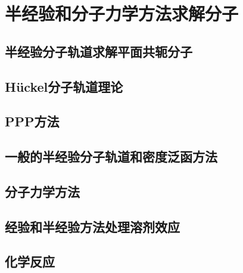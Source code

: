\chapter{半经验和分子力学方法求解分子}
\label{chap:17}
\section{半经验分子轨道求解平面共轭分子}
\label{sec:17.1 Semiempirical MO Treatments of Planar Conjugated Molecules}

\section{Hückel分子轨道理论}
\label{sec:17.2 The Hückel MO Method}

\section{PPP方法}
\label{sec:17.3 The PPP Method}

\section{一般的半经验分子轨道和密度泛函方法}
\label{sec:17.4 General Semiempirical MO and DFT Methods}

\section{分子力学方法}
\label{sec:17.5 The Molecular-Mechanics Method}

\section{经验和半经验方法处理溶剂效应}
\label{sec:17.6 Empirical and Semiempirical Treatments of Treating Solvent Effects}

\section{化学反应}
\label{sec:17.7 Chemical Reactions}

